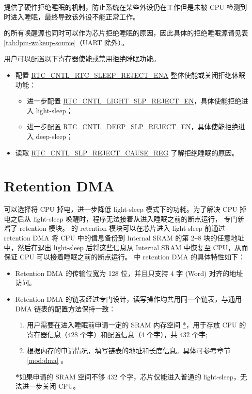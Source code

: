 \documentclass[main\_\_CN.tex]{subfiles}
\begin{document}
\chipname{} 提供了硬件拒绝睡眠的机制，防止系统在某些外设仍在工作但是未被 CPU 检测到时进入睡眠，最终导致该外设不能正常工作。

\chipname{} 的所有唤醒源也同时可以作为芯片拒绝睡眠的原因，因此具体的拒绝睡眠源请见表 \ref{tab:lpm-wakeup-source}（UART 除外）。

用户可以配置以下寄存器使能或禁用拒绝睡眠功能。
\begin{itemize}
    \item 配置 \hyperref[fielddesc:RTCCNTLRTCSLEEPREJECTENA]{RTC\_CNTL\_RTC\_SLEEP\_REJECT\_ENA} 整体使能或关闭拒绝休眠功能：
        \begin{itemize}
            \item 进一步配置 \hyperref[fielddesc:RTCCNTLLIGHTSLPREJECTEN]{RTC\_CNTL\_LIGHT\_SLP\_REJECT\_EN}，具体使能拒绝进入 light-sleep；
            \item 进一步配置 \hyperref[fielddesc:RTCCNTLDEEPSLPREJECTEN]{RTC\_CNTL\_DEEP\_SLP\_REJECT\_EN}，具体使能拒绝进入 deep-sleep；
        \end{itemize}
    \item 读取 \hyperref[fielddesc:RTCCNTLREJECTCAUSE]{RTC\_CNTL\_SLP\_REJECT\_CAUSE\_REG} 了解拒绝睡眠的原因。
\end{itemize}

\section{Retention DMA}

\chipname{} 可以选择将 CPU 掉电，进一步降低 light-sleep 模式下的功耗。为了解决 CPU 掉电之后从 light-sleep 唤醒时，程序无法接着从进入睡眠之前的断点运行，\chipname{} 专门新增了 retention 模块。
\chipname{} 的 retention 模块可以在芯片进入 light-sleep 前通过 retention DMA 将 CPU 中的信息备份到 Internal SRAM 的第 2\verb+~+8 块的任意地址中，然后在退出 light-sleep 后将这些信息从 Internal SRAM 中恢复至 CPU，从而保证 CPU 可以接着睡眠之前的断点运行。
\chipname{} 中 retention DMA 的具体特性如下：

\begin{itemize}
    \item Retention DMA 的传输位宽为 128 位，并且只支持 4 字 (Word) 对齐的地址访问。
    \item Retention DMA 的链表经过专门设计，读写操作均共用同一个链表，与通用 DMA 链表的配置方法保持一致：
    \begin{enumerate}
        \item 用户需要在进入睡眠前申请一定的 SRAM 内存空间 \hyperref[dma-note1]{*}，用于存放 CPU 的寄存器信息（428 个字）和配置信息（4 个字），共 432 个字;
        \item 根据内存的申请情况，填写链表的地址和长度信息。具体可参考章节 \ref{mod:dma} \textit{}。
    \end{enumerate}

\begin{tiplisting}\label{dma-note1}
\textbf{*}如果申请的 SRAM 空间不够 432 个字，芯片仅能进入普通的 light-sleep，无法进一步关闭 CPU。
\end{tiplisting}
\end{itemize}
\end{document}
